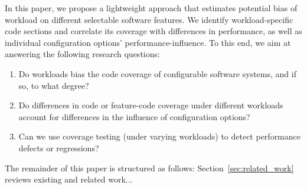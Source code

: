 \documentclass[conference]{IEEEtran}
\begin{document}
In this paper, we propose a lightweight approach that estimates potential bias of workload on different selectable software features. %
We identify workload-specific code sections and correlate its coverage with differences in performance, as well as individual configuration options'  performance-influence. To this end, we aim at answering the following research questions:

\begin{enumerate}
	\item Do workloads bias the code coverage of configurable software systems, and if so, to what degree?
	\item Do differences in code or feature-code coverage under different workloads account for differences in the influence of configuration options?
	\item Can we use coverage testing (under varying workloads) to detect performance defects or regressions?
\end{enumerate}

The remainder of this paper is structured as follows: Section~\ref{sec:related_work} reviews existing and related work...
\end{document}
